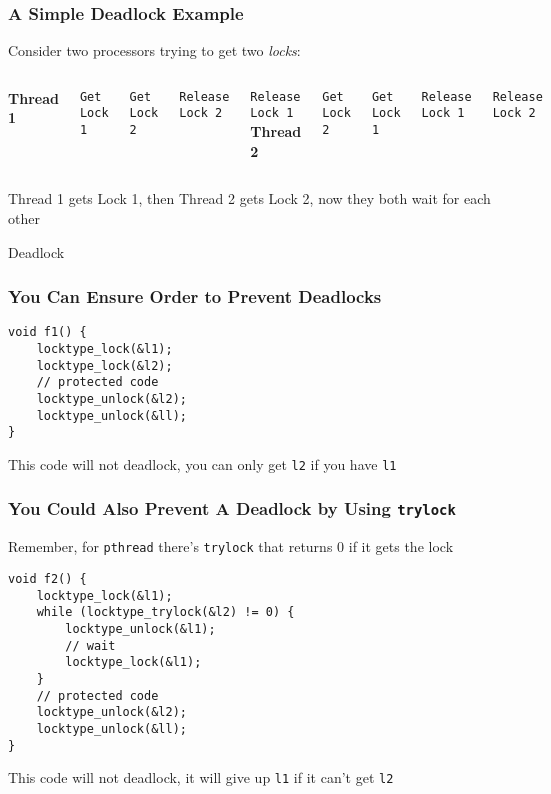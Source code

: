   \begin{frame}[containsverbatim]
    \frametitle{A Simple Deadlock Example}

    Consider two processors trying to get two {\it locks}:

    \vspace{2em}

    \begin{columns}
        {\bf Thread 1}

        \verb+Get Lock 1+

        \verb+Get Lock 2+

        \verb+Release Lock 2+

        \verb+Release Lock 1+
        {\bf Thread 2}

        \verb+Get Lock 2+

        \verb+Get Lock 1+

        \verb+Release Lock 1+

        \verb+Release Lock 2+
    \end{columns}

    \vspace{2em}

    Thread 1 gets Lock 1, then Thread 2 gets Lock 2, now
    they both wait for each other

    \hspace{2em} Deadlock
  \end{frame}

  \begin{frame}[fragile]
    \frametitle{You Can Ensure Order to Prevent Deadlocks}

    \begin{lstlisting}
void f1() {
    locktype_lock(&l1);
    locktype_lock(&l2);
    // protected code
    locktype_unlock(&l2);
    locktype_unlock(&ll);    
}
    \end{lstlisting}

    This code will not deadlock, you can only get {\tt l2} if you have
    {\tt l1}
  \end{frame}

  \begin{frame}[fragile]
    \frametitle{You Could Also Prevent A Deadlock by Using {\tt trylock}}

    Remember, for {\tt pthread} there's {\tt trylock} that returns 0 if it gets
    the lock

    \begin{lstlisting}
void f2() {
    locktype_lock(&l1);
    while (locktype_trylock(&l2) != 0) {
        locktype_unlock(&l1);
        // wait
        locktype_lock(&l1);
    }
    // protected code
    locktype_unlock(&l2);
    locktype_unlock(&ll);    
}
    \end{lstlisting}

    This code will not deadlock, it will give up {\tt l1} if it can't get
    {\tt l2}
  \end{frame}

